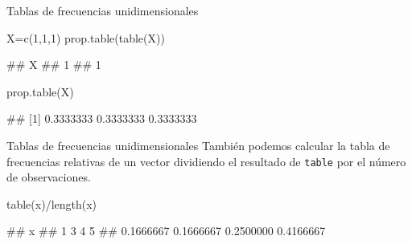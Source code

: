 \documentclass[
  ignorenonframetext,
  aspectratio=169]{beamer}
\newenvironment{Shaded}{\begin{snugshade}}{\end{snugshade}}
\newcommand{\DecValTok}[1]{\textcolor[rgb]{0.00,0.00,0.81}{#1}}
\newcommand{\FunctionTok}[1]{\textcolor[rgb]{0.00,0.00,0.00}{#1}}
\newcommand{\NormalTok}[1]{#1}
\newcommand{\OtherTok}[1]{\textcolor[rgb]{0.56,0.35,0.01}{#1}}
\newcommand{\SpecialCharTok}[1]{\textcolor[rgb]{0.00,0.00,0.00}{#1}}
\let\oldverbatim\verbatim
\let\endoldverbatim\endverbatim
\renewenvironment{verbatim}{\tiny\oldverbatim}{\endoldverbatim}
\begin{document}
\begin{frame}[fragile]{Tablas de frecuencias unidimensionales}
\protect\hypertarget{tablas-de-frecuencias-unidimensionales-10}{}
\begin{Shaded}
\begin{Highlighting}[]
\NormalTok{X}\OtherTok{=}\FunctionTok{c}\NormalTok{(}\DecValTok{1}\NormalTok{,}\DecValTok{1}\NormalTok{,}\DecValTok{1}\NormalTok{)}
\FunctionTok{prop.table}\NormalTok{(}\FunctionTok{table}\NormalTok{(X))}
\end{Highlighting}
\end{Shaded}

\begin{verbatim}
## X
## 1 
## 1
\end{verbatim}

\begin{Shaded}
\begin{Highlighting}[]
\FunctionTok{prop.table}\NormalTok{(X)}
\end{Highlighting}
\end{Shaded}

\begin{verbatim}
## [1] 0.3333333 0.3333333 0.3333333
\end{verbatim}
\end{frame}

\begin{frame}[fragile]{Tablas de frecuencias unidimensionales}
\protect\hypertarget{tablas-de-frecuencias-unidimensionales-11}{}
También podemos calcular la tabla de frecuencias relativas de un vector
dividiendo el resultado de \texttt{table} por el número de
observaciones.

\begin{Shaded}
\begin{Highlighting}[]
\FunctionTok{table}\NormalTok{(x)}\SpecialCharTok{/}\FunctionTok{length}\NormalTok{(x)}
\end{Highlighting}
\end{Shaded}

\begin{verbatim}
## x
##         1         3         4         5 
## 0.1666667 0.1666667 0.2500000 0.4166667
\end{verbatim}
\end{frame}
\end{document}
